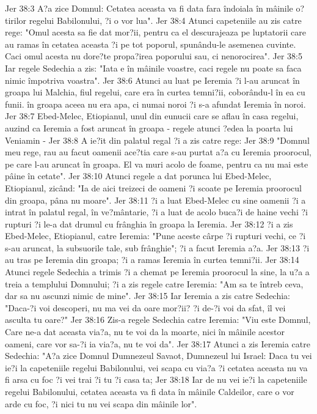 Jer 38:3  A?a zice Domnul: Cetatea aceasta va fi data fara îndoiala în mâinile o?tirilor regelui Babilonului, ?i o vor lua".
Jer 38:4  Atunci capeteniile au zis catre rege: "Omul acesta sa fie dat mor?ii, pentru ca el descurajeaza pe luptatorii care au ramas în cetatea aceasta ?i pe tot poporul, spunându-le asemenea cuvinte. Caci omul acesta nu dore?te propa?irea poporului sau, ci nenorocirea".
Jer 38:5  Iar regele Sedechia a zis: "Iata e în mâinile voastre, caci regele nu poate sa faca nimic împotriva voastra".
Jer 38:6  Atunci au luat pe Ieremia ?i l-au aruncat în groapa lui Malchia, fiul regelui, care era în curtea temni?ii, coborându-l în ea cu funii. în groapa aceea nu era apa, ci numai noroi ?i s-a afundat Ieremia în noroi.
Jer 38:7  Ebed-Melec, Etiopianul, unul din eunucii care se aflau în casa regelui, auzind ca Ieremia a fost aruncat în groapa - regele atunci ?edea la poarta lui Veniamin -
Jer 38:8  A ie?it din palatul regal ?i a zis catre rege:
Jer 38:9  "Domnul meu rege, rau au facut oamenii ace?tia care s-au purtat a?a cu Ieremia proorocul, pe care l-au aruncat în groapa. El va muri acolo de foame, pentru ca nu mai este pâine în cetate".
Jer 38:10  Atunci regele a dat porunca lui Ebed-Melec, Etiopianul, zicând: "Ia de aici treizeci de oameni ?i scoate pe Ieremia proorocul din groapa, pâna nu moare".
Jer 38:11  ?i a luat Ebed-Melec cu sine oamenii ?i a intrat în palatul regal, în ve?mântarie, ?i a luat de acolo buca?i de haine vechi ?i rupturi ?i le-a dat drumul cu frânghia în groapa la Ieremia.
Jer 38:12  ?i a zis Ebed-Melec, Etiopianul, catre Ieremia: "Pune aceste cârpe ?i rupturi vechi, ce ?i s-au aruncat, la subsuorile tale, sub frânghie"; ?i a facut Ieremia a?a.
Jer 38:13  ?i au tras pe Ieremia din groapa; ?i a ramas Ieremia în curtea temni?ii.
Jer 38:14  Atunci regele Sedechia a trimis ?i a chemat pe Ieremia proorocul la sine, la u?a a treia a templului Domnului; ?i a zis regele catre Ieremia: "Am sa te întreb ceva, dar sa nu ascunzi nimic de mine".
Jer 38:15  Iar Ieremia a zis catre Sedechia: "Daca-?i voi descoperi, nu ma vei da oare mor?ii? ?i de-?i voi da sfat, îl vei asculta tu oare?"
Jer 38:16  Zis-a regele Sedechia catre Ieremia: "Viu este Domnul, Care ne-a dat aceasta via?a, nu te voi da la moarte, nici în mâinile acestor oameni, care vor sa-?i ia via?a, nu te voi da".
Jer 38:17  Atunci a zis Ieremia catre Sedechia: "A?a zice Domnul Dumnezeul Savaot, Dumnezeul lui Israel: Daca tu vei ie?i la capeteniile regelui Babilonului, vei scapa cu via?a ?i cetatea aceasta nu va fi arsa cu foc ?i vei trai ?i tu ?i casa ta;
Jer 38:18  Iar de nu vei ie?i la capeteniile regelui Babilonului, cetatea aceasta va fi data în mâinile Caldeilor, care o vor arde cu foc, ?i nici tu nu vei scapa din mâinile lor".
